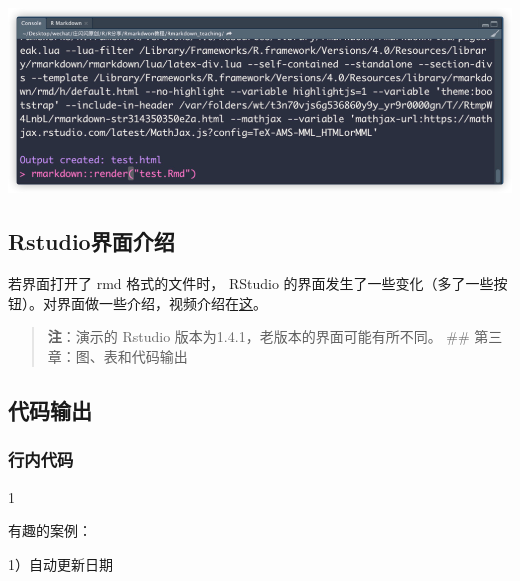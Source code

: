 \documentclass[
]{book}
\newenvironment{Shaded}{\begin{snugshade}}{\end{snugshade}}
\newcommand{\NormalTok}[1]{#1}
\begin{document}
\includegraphics{images/paste-6EDE02D4.png}

\hypertarget{rstudioux754cux9762ux4ecbux7ecd}{%
\subsection{Rstudio界面介绍}\label{rstudioux754cux9762ux4ecbux7ecd}}

若界面打开了 rmd 格式的文件时， RStudio
的界面发生了一些变化（多了一些按钮）。对界面做一些介绍，视频介绍在\href{https://mp.weixin.qq.com/s/Dl1a36omEVI1QGP0HgbuyA}{这}。

\begin{quote}
\textbf{注}：演示的 Rstudio 版本为1.4.1，老版本的界面可能有所不同。 \#\#
第三章：图、表和代码输出
\end{quote}

\hypertarget{ux4ee3ux7801ux8f93ux51fa}{%
\subsection{代码输出}\label{ux4ee3ux7801ux8f93ux51fa}}

\hypertarget{ux884cux5185ux4ee3ux7801}{%
\subsubsection{行内代码}\label{ux884cux5185ux4ee3ux7801}}

\begin{Shaded}
\begin{Highlighting}[]
\NormalTok{1 }
\end{Highlighting}
\end{Shaded}

有趣的案例：

1）自动更新日期
\end{document}
